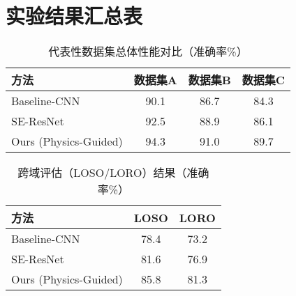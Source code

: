 \chapter{实验结果汇总表}

\begin{table}[h]
\centering
\caption{代表性数据集总体性能对比（准确率\%）}
\label{tab:overall_performance}
\begin{tabular}{lccc}
\toprule
方法 & 数据集A & 数据集B & 数据集C \\
\midrule
Baseline-CNN & 90.1 & 86.7 & 84.3 \\
SE-ResNet & 92.5 & 88.9 & 86.1 \\
Ours (Physics-Guided) & 94.3 & 91.0 & 89.7 \\
\bottomrule
\end{tabular}
\end{table}

\begin{table}[h]
\centering
\caption{跨域评估（LOSO/LORO）结果（准确率\%）}
\label{tab:cross_domain}
\begin{tabular}{lcc}
\toprule
方法 & LOSO & LORO \\
\midrule
Baseline-CNN & 78.4 & 73.2 \\
SE-ResNet & 81.6 & 76.9 \\
Ours (Physics-Guided) & 85.8 & 81.3 \\
\bottomrule
\end{tabular}
\end{table}

